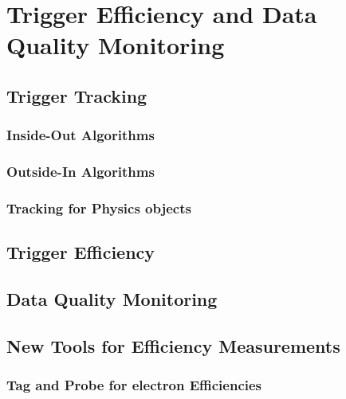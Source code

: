 \chapter{Trigger Efficiency and Data Quality Monitoring}

\section{Trigger Tracking}
\subsection{Inside-Out Algorithms}
\subsection{Outside-In Algorithms}
\subsection{Tracking for Physics objects}

\section{Trigger Efficiency}

\section{Data Quality Monitoring}

\section{New Tools for Efficiency Measurements}
\subsection{Tag and Probe for electron Efficiencies}